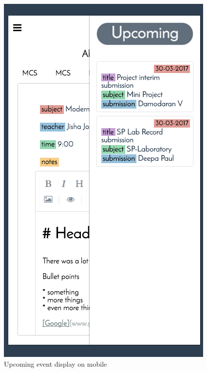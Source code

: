\documentclass{article}
\begin{document}
\begin{figure}
  \includegraphics[width=\linewidth]{mobileupcoming.png}
  \caption{Upcoming event display on mobile}
\end{figure}
\end{document}
